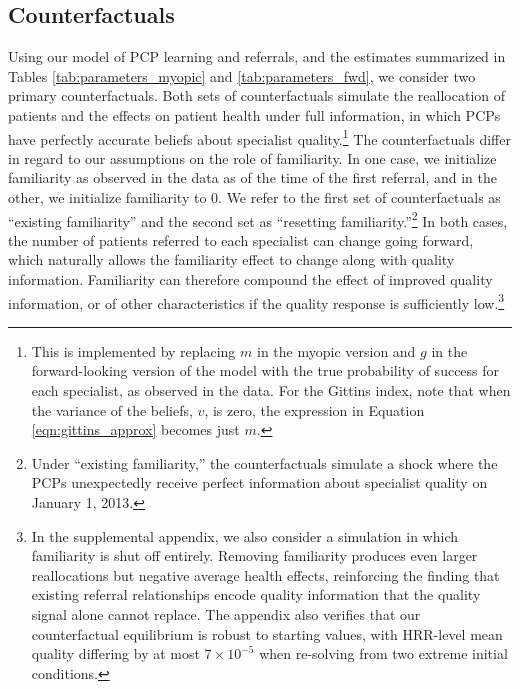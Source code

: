 \documentclass[12pt]{article}
\begin{document}
\subsection{Counterfactuals}

Using our model of PCP learning and referrals, and the estimates summarized in Tables \ref{tab:parameters_myopic} and \ref{tab:parameters_fwd}, we consider two primary counterfactuals. Both sets of counterfactuals simulate the reallocation of patients and the effects on patient health under full information, in which PCPs have perfectly accurate beliefs about specialist quality.\footnote{This is implemented by replacing $m$ in the myopic version and $g$ in the forward-looking version of the model with the true probability of success for each specialist, as observed in the data. For the Gittins index, note that when the variance of the beliefs, $v$, is zero, the expression in Equation \eqref{eqn:gittins_approx} becomes just $m$.} The counterfactuals differ in regard to our assumptions on the role of familiarity. In one case, we initialize familiarity as observed in the data as of the time of the first referral, and in the other, we initialize familiarity to 0. We refer to the first set of counterfactuals as ``existing familiarity'' and the second set as ``resetting familiarity.''\footnote{Under ``existing familiarity,'' the counterfactuals simulate a shock where the PCPs unexpectedly receive perfect information about specialist quality on January 1, 2013.} In both cases, the number of patients referred to each specialist can change going forward, which naturally allows the familiarity effect to change along with quality information. Familiarity can therefore compound the effect of improved quality information, or of other characteristics if the quality response is sufficiently low.\footnote{In the supplemental appendix, we also consider a simulation in which familiarity is shut off entirely. Removing familiarity produces even larger reallocations but negative average health effects, reinforcing the finding that existing referral relationships encode quality information that the quality signal alone cannot replace. The appendix also verifies that our counterfactual equilibrium is robust to starting values, with HRR-level mean quality differing by at most $7 \times 10^{-5}$ when re-solving from two extreme initial conditions.}
\end{document}
